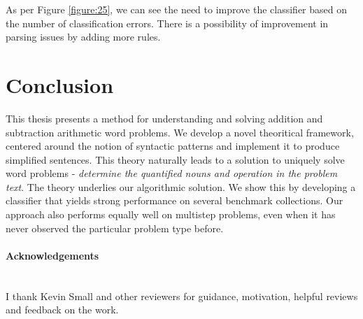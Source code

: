 \documentclass[11pt]{article}
\begin{document}
As per Figure \ref{figure:25}, we can see the need to improve the classifier based on the number of classification errors. There is a possibility of improvement in parsing issues by adding more rules. 

\section{Conclusion}\label{sec:conclusion}
This thesis presents a method for understanding and solving addition and subtraction arithmetic word problems. We develop a novel theoritical framework, centered around the notion of syntactic patterns and implement it to produce simplified sentences. This theory naturally leads to a solution to uniquely solve word problems - \textit{determine the quantified nouns and operation in the problem text}. The theory underlies our algorithmic solution. We show this by developing a classifier that yields strong performance on several benchmark collections. Our approach also performs equally well on multistep problems, even when it has never observed the particular problem type before.


\paragraph{Acknowledgements} \hspace{0pt} \\
I thank Kevin Small and other reviewers for guidance, motivation, helpful reviews and feedback on the work.

\newpage


\end{document}
